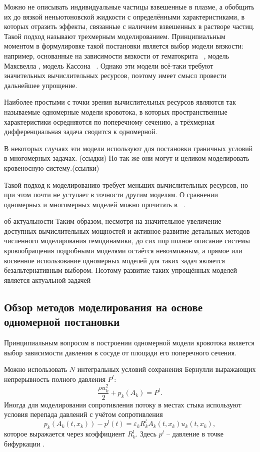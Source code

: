 Можно не описывать индивидуальные частицы взвешенные в плазме, а обобщить их до вязкой неньютоновской жидкости с определёнными 
характеристиками, в которых отразить эффекты, связанные с наличием взвешенных в растворе частиц. Такой подход называют трехмерным моделированием.
Принципиальным моментом в формулировке такой постановки является выбор модели вязкости: например,
основанные на зависимости вязкости от гематокрита ~\cite{walburn:1976},
модель Максвелла \cite{thurston:1972},  модель Кассона ~\cite{moller:2006}.
Однако эти модели всё-таки требуют значительных вычислительных ресурсов, поэтому имеет смысл провести дальнейшее упрощение.

Наиболее простыми с точки зрения вычислительных ресурсов являются так называемые одномерные модели кровотока, в которых
пространственные характеристики осредняются по поперечному сечению, а трёхмерная дифференциальная
задача сводится к одномерной.

В некоторых случаях эти модели используют для постановки граничных условий в многомерных задачах. (ссыдки)
Но так же они могут и целиком моделировать кровеносную систему.(ссылки)

Такой подход к моделированию требует меньших вычислительных ресурсов, но при этом почти не уступает в 
точности другим моделям. О сравнении одномерных и многомерных моделей можно прочитать в ~\cite{FORMAGGIA:2001}.

{ об актуальности}
Таким образом, несмотря на значительное увеличение доступных вычислительных мощностей и активное развитие детальных методов
численного моделирования гемодинамики, до сих пор полное описание системы кровообращения подробными моделями остаётся невозможным, 
а прямое или косвенное использование одномерных моделей для таких задач является безальтернативным выбором.
Поэтому развитие таких упрощённых моделей является актуальной задачей

\subsection{Обзор методов моделирования на основе одномерной постановки}

Принципиальным вопросом в построении одномерной модели кровотока является выбор зависимости давления в сосуде от площади его
поперечного сечения.

Можно использовать $N$ интегральных условий сохранения Бернулли выражающих непрерывность полного давления $P^l$:
\begin{equation}
    \label{eq:bernulli}
    \frac{\rho u^2_k}{2}+{p_k(A_k)}=P^l.
\end{equation}
Иногда для моделирования сопротивления потоку в местах стыка используют условия перепада давлений
с учётом сопротивления
\begin{equation}
    \label{eq:p-pressure}
    p_k\left(A_k\left(t,x_k\right)\right)-p^l(t)=\varepsilon_k R^l_k A_k(t,x_k)u_k(t,x_k),
\end{equation}
которое выражается через коэффициент $R^l_k$. Здесь $p^l$ -- давление в точке бифуркации \cite{bessonov:2014}.

